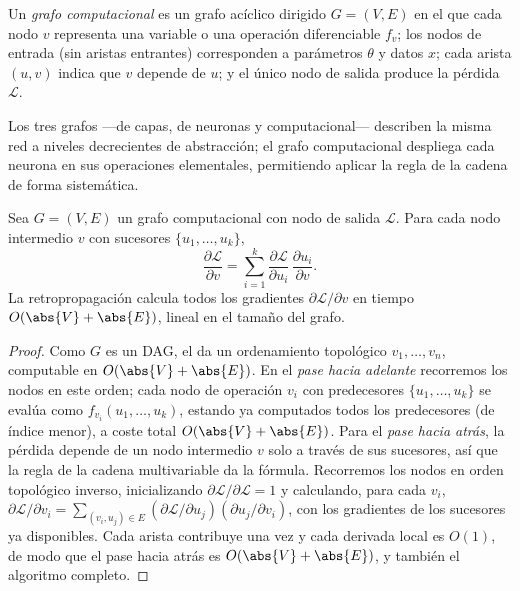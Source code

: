 \begin{definition}
\label{def:found:compgraph}
Un \emph{grafo computacional} es un grafo ac\'iclico dirigido $G = (V, E)$ en el
que cada nodo $v$ representa una variable o una operaci\'on diferenciable $f_v$;
los nodos de entrada (sin aristas entrantes) corresponden a par\'ametros $\theta$
y datos $x$; cada arista $(u, v)$ indica que $v$ depende de $u$; y el \'unico nodo
de salida produce la p\'erdida $\mathcal{L}$.
\end{definition}

Los tres grafos ---de capas, de neuronas y computacional--- describen la misma red
a niveles decrecientes de abstracci\'on; el grafo computacional despliega cada
neurona en sus operaciones elementales, permitiendo aplicar la regla de la cadena
de forma sistem\'atica.

\begin{theorem}
\label{thm:found:backprop}
Sea $G = (V, E)$ un grafo computacional con nodo de salida $\mathcal{L}$. Para cada
nodo intermedio $v$ con sucesores $\{u_1, \ldots, u_k\}$,
\[
  \frac{\partial \mathcal{L}}{\partial v}
  = \sum_{i=1}^k \frac{\partial \mathcal{L}}{\partial u_i}\,
  \frac{\partial u_i}{\partial v}.
\]
La retropropagaci\'on calcula todos los gradientes $\partial\mathcal{L}/\partial v$
en tiempo $O(\abs{V} + \abs{E})$, lineal en el tama\~no del grafo.
\end{theorem}

\begin{proof}
Como $G$ es un DAG, el  da un ordenamiento topol\'ogico
$v_1, \ldots, v_n$, computable en $O(\abs{V} + \abs{E})$. En el \emph{pase hacia
adelante} recorremos los nodos en este orden; cada nodo de operaci\'on $v_i$ con
predecesores $\{u_1, \ldots, u_k\}$ se eval\'ua como $f_{v_i}(u_1, \ldots, u_k)$,
estando ya computados todos los predecesores (de \'indice menor), a coste total
$O(\abs{V} + \abs{E})$. Para el \emph{pase hacia atr\'as}, la p\'erdida depende de
un nodo intermedio $v$ solo a trav\'es de sus sucesores, as\'i que la regla de la
cadena multivariable da la f\'ormula. Recorremos los nodos en orden topol\'ogico
inverso, inicializando $\partial\mathcal{L}/\partial\mathcal{L} = 1$ y calculando,
para cada $v_i$, $\partial\mathcal{L}/\partial v_i = \sum_{(v_i, u_j) \in E}
(\partial\mathcal{L}/\partial u_j)(\partial u_j/\partial v_i)$, con los gradientes
de los sucesores ya disponibles. Cada arista contribuye una vez y cada derivada
local es $O(1)$, de modo que el pase hacia atr\'as es $O(\abs{V} + \abs{E})$, y
tambi\'en el algoritmo completo.
\end{proof}

